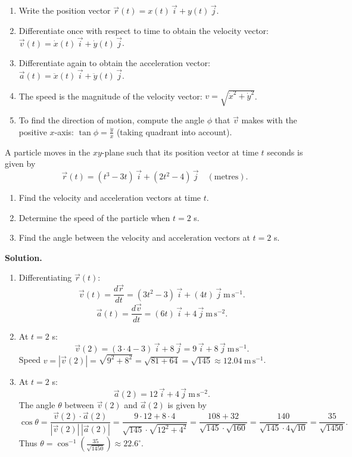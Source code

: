 \documentclass[11pt]{article}
\begin{document}
\begin{methode}
\begin{enumerate}
\item Write the position vector $\vec{r}(t) = x(t)\,\vec{i} + y(t)\,\vec{j}$.
\item Differentiate once with respect to time to obtain the velocity vector: $\vec{v}(t) = \dot{x}(t)\,\vec{i} + \dot{y}(t)\,\vec{j}$.
\item Differentiate again to obtain the acceleration vector: $\vec{a}(t) = \ddot{x}(t)\,\vec{i} + \ddot{y}(t)\,\vec{j}$.
\item The speed is the magnitude of the velocity vector: $v = \sqrt{\dot{x}^2 + \dot{y}^2}$.
\item To find the direction of motion, compute the angle $\phi$ that $\vec{v}$ makes with the positive $x$-axis: $\tan\phi = \frac{\dot{y}}{\dot{x}}$ (taking quadrant into account).
\end{enumerate}
\end{methode}

\begin{exoresolu}
A particle moves in the $xy$-plane such that its position vector at time $t$ seconds is given by
\[
\vec{r}(t) = (t^3 - 3t)\,\vec{i} + (2t^2 - 4)\,\vec{j} \quad (\text{metres}).
\]
\begin{enumerate}
\item Find the velocity and acceleration vectors at time $t$.
\item Determine the speed of the particle when $t = 2$ s.
\item Find the angle between the velocity and acceleration vectors at $t = 2$ s.
\end{enumerate}
\tcblower
\textbf{Solution.}
\begin{enumerate}
\item Differentiating $\vec{r}(t)$:
\[
\vec{v}(t) = \frac{d\vec{r}}{dt} = (3t^2 - 3)\,\vec{i} + (4t)\,\vec{j} \ \mathrm{m\,s^{-1}}.
\]
\[
\vec{a}(t) = \frac{d\vec{v}}{dt} = (6t)\,\vec{i} + 4\,\vec{j} \ \mathrm{m\,s^{-2}}.
\]
\item At $t = 2$ s:
\[
\vec{v}(2) = (3\cdot4 - 3)\,\vec{i} + 8\,\vec{j} = 9\,\vec{i} + 8\,\vec{j} \ \mathrm{m\,s^{-1}}.
\]
Speed $v = |\vec{v}(2)| = \sqrt{9^2 + 8^2} = \sqrt{81+64} = \sqrt{145} \approx 12.04 \ \mathrm{m\,s^{-1}}$.
\item At $t = 2$ s:
\[
\vec{a}(2) = 12\,\vec{i} + 4\,\vec{j} \ \mathrm{m\,s^{-2}}.
\]
The angle $\theta$ between $\vec{v}(2)$ and $\vec{a}(2)$ is given by
\[
\cos\theta = \frac{\vec{v}(2)\cdot\vec{a}(2)}{|\vec{v}(2)|\,|\vec{a}(2)|}
= \frac{9\cdot12 + 8\cdot4}{\sqrt{145}\cdot\sqrt{12^2+4^2}}
= \frac{108+32}{\sqrt{145}\cdot\sqrt{160}}
= \frac{140}{\sqrt{145}\cdot4\sqrt{10}} = \frac{35}{\sqrt{1450}}.
\]
Thus $\theta = \cos^{-1}\left(\frac{35}{\sqrt{1450}}\right) \approx 22.6^\circ$.
\end{enumerate}
\end{exoresolu}
\end{document}
